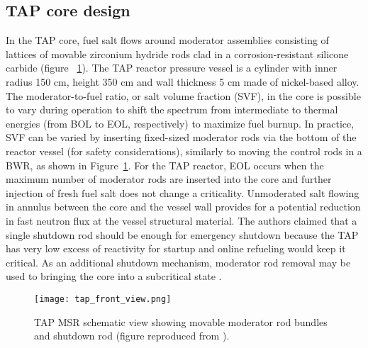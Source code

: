 \subsection{TAP core design}
In the \gls{TAP} core, fuel salt flows around moderator assemblies consisting 
of lattices of 
movable zirconium hydride rods clad in a corrosion-resistant silicone carbide (figure~
\ref{fig:tap-main-view}). The \gls{TAP} reactor pressure vessel is a cylinder 
with inner 
radius 150 cm, 
height 350 cm and wall thickness 5 cm made of nickel-based alloy. The moderator-to-fuel 
ratio, or salt volume fraction (SVF), in the core is possible to vary during operation to 
shift the spectrum from intermediate to thermal energies (from \gls{BOL} to \gls{EOL}, 
respectively) to maximize fuel burnup. In practice, SVF can be varied by inserting 
fixed-sized moderator rods via the bottom of the reactor vessel (for safety 
considerations), similarly to moving the control rods in a \gls{BWR}, as shown in 
Figure~\ref{fig:tap-main-view}. For the \gls{TAP} reactor, \gls{EOL} occurs when the 
maximum number of moderator rods are inserted into the core and further injection of 
fresh fuel salt does not change a criticality. Unmoderated salt flowing in annulus between the core and the vessel wall provides for a potential reduction in 
fast neutron flux at the vessel structural material. The authors claimed that a 
single shutdown rod should be enough for emergency shutdown because 
the \gls{TAP} has very low excess of reactivity for startup and online refueling would 
keep it critical. As an additional shutdown mechanism, moderator rod removal may be used 
to bringing 
the core into a subcritical state \cite{transatomic_power_corporation_neutronics_2016}.

\begin{figure}[htp!] %
  \centering
  		\hspace{+1.5in}
		  \texttt{[image: tap\_front\_view.png]}
  \caption{\gls{TAP} \gls{MSR} schematic view showing movable moderator rod 
  bundles and shutdown rod (figure reproduced from 
  \cite{transatomic_power_corporation_technical_2016}).}
  \label{fig:tap-main-view}
\end{figure}

